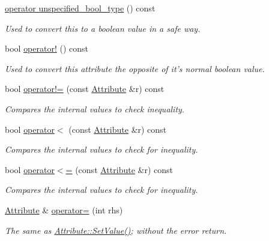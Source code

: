 \begin{DoxyCompactItemize}
\hyperlink{classMezzanine_1_1xml_1_1Attribute_a4986a63b38c79b74e13182d9e8ed4e28}{operator unspecified\_\-bool\_\-type} () const 
\begin{DoxyCompactList}\small\item\em Used to convert this to a boolean value in a safe way. \item\end{DoxyCompactList}\item 
bool \hyperlink{classMezzanine_1_1xml_1_1Attribute_a6ed5b74cdc8d1556cdf2d5f21ce08144}{operator!} () const 
\begin{DoxyCompactList}\small\item\em Used to convert this attribute the opposite of it's normal boolean value. \item\end{DoxyCompactList}\item 
bool \hyperlink{classMezzanine_1_1xml_1_1Attribute_aa28a9fe2d91c72edb3fe19e8ffbb185e}{operator!=} (const \hyperlink{classMezzanine_1_1xml_1_1Attribute}{Attribute} \&r) const 
\begin{DoxyCompactList}\small\item\em Compares the internal values to check inequality. \item\end{DoxyCompactList}\item 
bool \hyperlink{classMezzanine_1_1xml_1_1Attribute_aa70a0ce1196f3626048a4997f80be7f5}{operator$<$} (const \hyperlink{classMezzanine_1_1xml_1_1Attribute}{Attribute} \&r) const 
\begin{DoxyCompactList}\small\item\em Compares the internal values to check for inequality. \item\end{DoxyCompactList}\item 
bool \hyperlink{classMezzanine_1_1xml_1_1Attribute_a8912c905e735a1f77af1389556b9b92d}{operator$<$=} (const \hyperlink{classMezzanine_1_1xml_1_1Attribute}{Attribute} \&r) const 
\begin{DoxyCompactList}\small\item\em Compares the internal values to check for inequality. \item\end{DoxyCompactList}\item 
\hyperlink{classMezzanine_1_1xml_1_1Attribute}{Attribute} \& \hyperlink{classMezzanine_1_1xml_1_1Attribute_a65304be10a0b2d94fbe3382958b45dfc}{operator=} (int rhs)
\begin{DoxyCompactList}\small\item\em The same as \hyperlink{classMezzanine_1_1xml_1_1Attribute_a850c7d6692ac542ea197952c734e3800}{Attribute::SetValue()}; without the error return. \item\end{DoxyCompactList}\item 

\end{DoxyCompactItemize}
